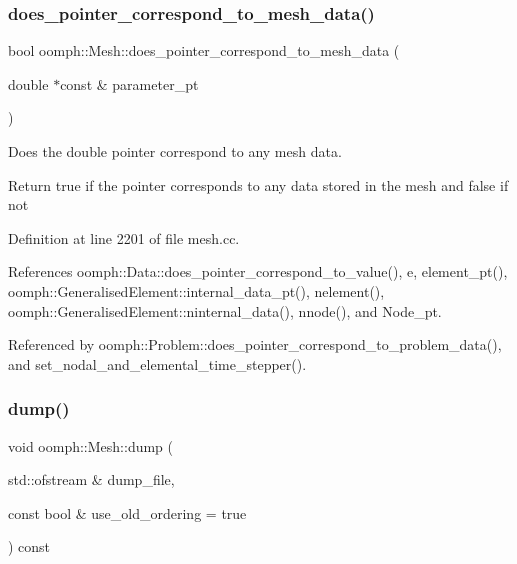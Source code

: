 \mbox{\label{classoomph_1_1Mesh_a13712b3fb8f01107772db51e01dbeee0}} 
\subsubsection{\texorpdfstring{does\+\_\+pointer\+\_\+correspond\+\_\+to\+\_\+mesh\+\_\+data()}{does\_pointer\_correspond\_to\_mesh\_data()}}
{\footnotesize\ttfamily bool oomph\+::\+Mesh\+::does\+\_\+pointer\+\_\+correspond\+\_\+to\+\_\+mesh\+\_\+data (\begin{DoxyParamCaption}\item[{double $\ast$const \&}]{parameter\+\_\+pt }\end{DoxyParamCaption})}



Does the double pointer correspond to any mesh data. 

Return true if the pointer corresponds to any data stored in the mesh and false if not 

Definition at line 2201 of file mesh.\+cc.



References oomph\+::\+Data\+::does\+\_\+pointer\+\_\+correspond\+\_\+to\+\_\+value(), e, element\+\_\+pt(), oomph\+::\+Generalised\+Element\+::internal\+\_\+data\+\_\+pt(), nelement(), oomph\+::\+Generalised\+Element\+::ninternal\+\_\+data(), nnode(), and Node\+\_\+pt.



Referenced by oomph\+::\+Problem\+::does\+\_\+pointer\+\_\+correspond\+\_\+to\+\_\+problem\+\_\+data(), and set\+\_\+nodal\+\_\+and\+\_\+elemental\+\_\+time\+\_\+stepper().

\mbox{\label{classoomph_1_1Mesh_af821b936768868ea5dd91495e9ae3bc0}} 
\subsubsection{\texorpdfstring{dump()}{dump()}\hspace{0.1cm}{\footnotesize\ttfamily [1/2]}}
{\footnotesize\ttfamily void oomph\+::\+Mesh\+::dump (\begin{DoxyParamCaption}\item[{std\+::ofstream \&}]{dump\+\_\+file,  }\item[{const bool \&}]{use\+\_\+old\+\_\+ordering = {\ttfamily true} }\end{DoxyParamCaption}) const\hspace{0.3cm}{\ttfamily [virtual]}}



